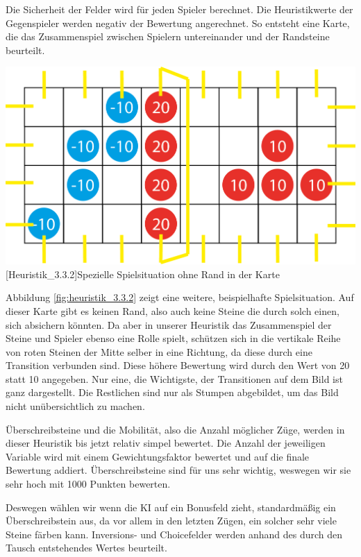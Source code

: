 \documentclass[12pt,a4paper,bibliography=totocnumbered,listof=totocnumbered]{scrartcl}
\begin{document}
	Die \glqq Sicherheit\grqq{} der Felder wird für jeden Spieler berechnet. Die Heuristikwerte der Gegenspieler werden negativ der Bewertung angerechnet. So entsteht eine Karte, die das Zusammenspiel zwischen Spielern untereinander und der Randsteine beurteilt.
	
	\vspace{1em}
	\begin{minipage}{\linewidth}
		\centering
		\includegraphics[width=0.6\linewidth]{pics/Kapitel_3/Kapitel_3_pic9.png}
		[Heuristik_3.3.2]{Spezielle Spielsituation ohne Rand in der Karte}
		\label{fig:heuristik_3.3.2}
	\end{minipage}
	\vspace{1em}

	Abbildung \ref{fig:heuristik_3.3.2} zeigt eine weitere, beispielhafte Spielsituation. Auf dieser Karte gibt es keinen Rand, also auch keine Steine die durch solch einen, sich absichern könnten. Da aber in unserer Heuristik das Zusammenspiel der Steine und Spieler ebenso eine Rolle spielt, schützen sich in die vertikale Reihe von roten Steinen der Mitte selber in eine Richtung, da diese durch eine Transition verbunden sind. Diese höhere Bewertung wird durch den Wert von 20 statt 10 angegeben. Nur eine, die Wichtigste, der Transitionen auf dem Bild ist ganz dargestellt. Die Restlichen sind nur als \glqq Stumpen \grqq{} abgebildet, um das Bild nicht unübersichtlich zu machen.
	
	Überschreibsteine und die Mobilität, also die Anzahl möglicher Züge, werden in dieser Heuristik bis jetzt relativ simpel bewertet. Die Anzahl der jeweiligen Variable wird mit einem Gewichtungsfaktor bewertet und auf die finale Bewertung addiert. Überschreibsteine sind für uns sehr wichtig, weswegen wir sie sehr hoch mit 1000 Punkten bewerten.
	
	Deswegen wählen wir wenn die KI auf ein Bonusfeld zieht, standardmäßig ein Überschreibstein aus, da vor allem in den letzten Zügen, ein solcher sehr viele Steine färben kann. Inversions- und Choicefelder werden anhand des durch den Tausch entstehendes Wertes beurteilt.
	
\end{document}
